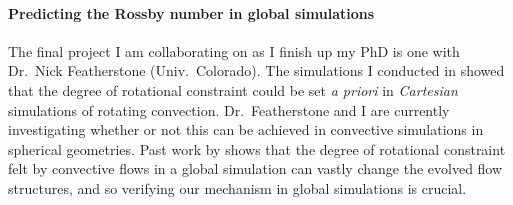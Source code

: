 \documentclass[preprint, hmargin=1in, vmargin=1in]{aastex62}
\begin{document}
\paragraph{Predicting the Rossby number in global simulations}
The final project I am collaborating on as I finish up my PhD is one with Dr.~Nick Featherstone (Univ.~Colorado).
The simulations I conducted in \citet{anders&brown2019} showed that the degree of rotational constraint could be set \emph{a priori} in \emph{Cartesian} simulations of rotating convection.
Dr.~Featherstone and I are currently investigating whether or not this can be achieved in convective simulations in spherical geometries.
Past work by \citet{featherstone&hindman2016} shows that the degree of rotational constraint felt by convective flows in a global simulation can vastly change the evolved flow structures, and so verifying our mechanism in global simulations is crucial.




\end{document}
